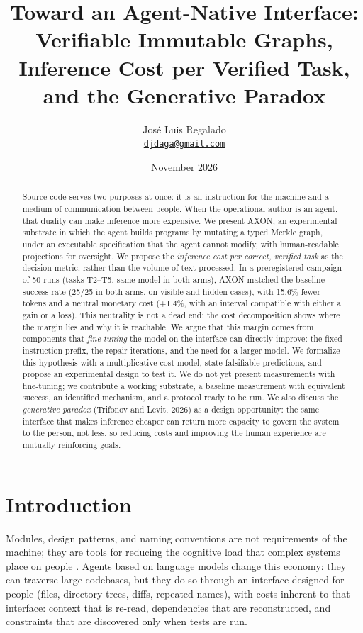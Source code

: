 \documentclass[11pt, a4paper]{article}
\title{\textbf{Toward an Agent-Native Interface: Verifiable Immutable Graphs, Inference Cost per Verified Task, and the Generative Paradox}}
\author{José Luis Regalado\\\href{mailto:djdaga@gmail.com}{\texttt{djdaga@gmail.com}}}
\date{November 2026}
\newcommand{\pc}{\%}
\begin{document}
\maketitle

\begin{abstract}
Source code serves two purposes at once: it is an instruction for the machine and a medium of communication between people. When the operational author is an agent, that duality can make inference more expensive. We present AXON, an experimental substrate in which the agent builds programs by mutating a typed Merkle graph, under an executable specification that the agent cannot modify, with human-readable projections for oversight. We propose the \emph{inference cost per correct, verified task} as the decision metric, rather than the volume of text processed. In a preregistered campaign of 50 runs (tasks T2--T5, same model in both arms), AXON matched the baseline success rate (25/25 in both arms, on visible and hidden cases), with 15.6\pc{} fewer tokens and a neutral monetary cost (+1.4\pc, with an interval compatible with either a gain or a loss). This neutrality is not a dead end: the cost decomposition shows where the margin lies and why it is reachable. We argue that this margin comes from components that \emph{fine-tuning} the model on the interface can directly improve: the fixed instruction prefix, the repair iterations, and the need for a larger model. We formalize this hypothesis with a multiplicative cost model, state falsifiable predictions, and propose an experimental design to test it. We do not yet present measurements with fine-tuning; we contribute a working substrate, a baseline measurement with equivalent success, an identified mechanism, and a protocol ready to be run. We also discuss the \emph{generative paradox} (Trifonov and Levit, 2026) as a design opportunity: the same interface that makes inference cheaper can return more capacity to govern the system to the person, not less, so reducing costs and improving the human experience are mutually reinforcing goals.
\end{abstract}

\section{Introduction}

Modules, design patterns, and naming conventions are not requirements of the machine; they are tools for reducing the cognitive load that complex systems place on people \cite{cao2026}. Agents based on language models change this economy: they can traverse large codebases, but they do so through an interface designed for people (files, directory trees, diffs, repeated names), with costs inherent to that interface: context that is re-read, dependencies that are reconstructed, and constraints that are discovered only when tests are run.
\end{document}
